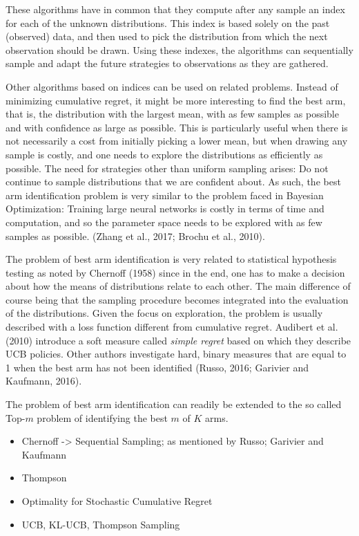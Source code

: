 \documentclass[12pt,]{article}
\begin{document}
These algorithms have in common that they compute after any sample an
index for each of the unknown distributions. This index is based solely
on the past (observed) data, and then used to pick the distribution from
which the next observation should be drawn. Using these indexes, the
algorithms can sequentially sample and adapt the future strategies to
observations as they are gathered.

Other algorithms based on indices can be used on related problems.
Instead of minimizing cumulative regret, it might be more interesting to
find the best arm, that is, the distribution with the largest mean, with
as few samples as possible and with confidence as large as possible.
This is particularly useful when there is not necessarily a cost from
initially picking a lower mean, but when drawing any sample is costly,
and one needs to explore the distributions as efficiently as possible.
The need for strategies other than uniform sampling arises: Do not
continue to sample distributions that we are confident about. As such,
the best arm identification problem is very similar to the problem faced
in Bayesian Optimization: Training large neural networks is costly in
terms of time and computation, and so the parameter space needs to be
explored with as few samples as possible. (Zhang et al., 2017; Brochu et
al., 2010).

The problem of best arm identification is very related to statistical
hypothesis testing as noted by Chernoff (1958) since in the end, one has
to make a decision about how the means of distributions relate to each
other. The main difference of course being that the sampling procedure
becomes integrated into the evaluation of the distributions. Given the
focus on exploration, the problem is usually described with a loss
function different from cumulative regret. Audibert et al. (2010)
introduce a soft measure called \emph{simple regret} based on which they
describe UCB policies. Other authors investigate hard, binary measures
that are equal to 1 when the best arm has not been identified (Russo,
2016; Garivier and Kaufmann, 2016).

The problem of best arm identification can readily be extended to the so
called Top-\(m\) problem of identifying the best \(m\) of \(K\) arms.

\begin{itemize}
\item
  Chernoff -\textgreater{} Sequential Sampling; as mentioned by Russo;
  Garivier and Kaufmann
\item
  Thompson
\item
  Optimality for Stochastic Cumulative Regret
\item
  UCB, KL-UCB, Thompson Sampling
\end{itemize}
\end{document}
